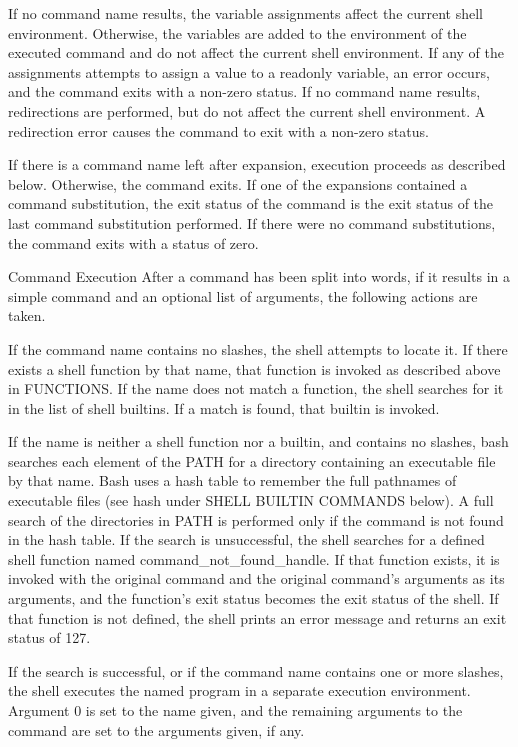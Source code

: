 \documentclass[11pt]{article}
\begin{document}
{{{If no command name results, the variable assignments affect the current shell environment. Otherwise, the variables are added to the environment of the executed command and do not affect the current shell environment. If any of the assignments attempts to assign a value to a readonly variable, an error occurs, and the command exits with a non-zero status.
If no command name results, redirections are performed, but do not affect the current shell environment. A redirection error causes the command to exit with a non-zero status.

If there is a command name left after expansion, execution proceeds as described below. Otherwise, the command exits. If one of the expansions contained a command substitution, the exit status of the command is the exit status of the last command substitution performed. If there were no command substitutions, the command exits with a status of zero.

Command Execution
After a command has been split into words, if it results in a simple command and an optional list of arguments, the following actions are taken.

If the command name contains no slashes, the shell attempts to locate it. If there exists a shell function by that name, that function is invoked as described above in FUNCTIONS. If the name does not match a function, the shell searches for it in the list of shell builtins. If a match is found, that builtin is invoked.

If the name is neither a shell function nor a builtin, and contains no slashes, bash searches each element of the PATH for a directory containing an executable file by that name. Bash uses a hash table to remember the full pathnames of executable files (see hash under SHELL BUILTIN COMMANDS below). A full search of the directories in PATH is performed only if the command is not found in the hash table. If the search is unsuccessful, the shell searches for a defined shell function named command_not_found_handle. If that function exists, it is invoked with the original command and the original command's arguments as its arguments, and the function's exit status becomes the exit status of the shell. If that function is not defined, the shell prints an error message and returns an exit status of 127.

If the search is successful, or if the command name contains one or more slashes, the shell executes the named program in a separate execution environment. Argument 0 is set to the name given, and the remaining arguments to the command are set to the arguments given, if any.

}}}
\end{document}
